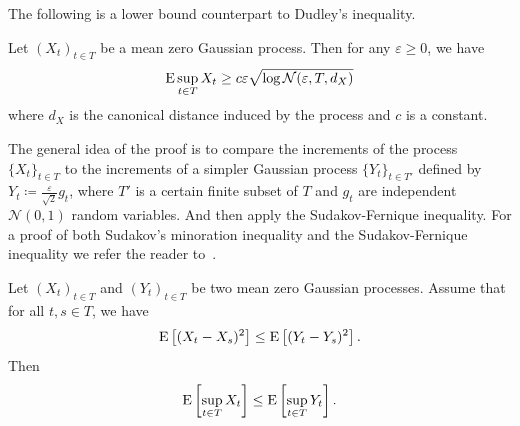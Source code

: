 
The following is a lower bound counterpart to Dudley's inequality.
\begin{theorem}
    Let \((X_{t})_{t \in T}\) be a mean zero Gaussian process. Then for any \(\varepsilon \geq 0\), we have
    \[
        \operatorname*{E} \sup_{t \in T} X_{t} \geq c \varepsilon \sqrt{\log \mathcal{N}( \varepsilon,T,d_{X})}
    \]
    where \(d_{X}\) is the canonical distance induced by the process and \(c\) is a constant.
\end{theorem}
The general idea of the proof is to compare the increments of the process \( \{ X_{t} \}_{t \in T} \) to the increments of a simpler Gaussian process \( \{ Y_{t} \}_{t \in T'} \)
defined by \( Y_{t} \coloneqq \frac{\varepsilon}{\sqrt{2}} g_{t} \), where $T'$ is a certain finite subset of $T$ and \( g_{t} \) are independent \( \mathcal{N}(0,1) \) random variables. And then apply the Sudakov-Fernique inequality.
For a proof of both Sudakov's minoration inequality and the Sudakov-Fernique inequality we refer the reader to~\cite{vershynin2020high}. 
\begin{theorem}
    Let \( (X_{t})_{t \in T} \) and \( (Y_{t})_{t \in T} \) be two mean zero Gaussian processes. Assume that for all \( t,s \in T \), we have
    \[
        \operatorname*{E}\left[(X_{t}-X_{s})^2\right] \leq \operatorname*{E}\left[(Y_{t}-Y_{s})^2\right].
    \]
    Then
    \[
        \operatorname*{E}\left[\sup_{t \in T} X_{t}\right] \leq \operatorname*{E}\left[\sup_{t \in T} Y_{t}\right].
    \]   
\end{theorem}
